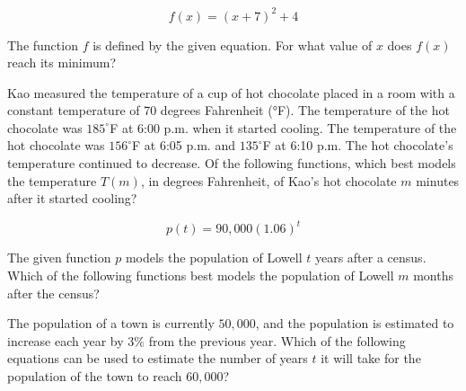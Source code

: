 \[f(x) = (x + 7)^2 + 4\]


The function $f$ is defined by the given equation.  
For what value of $x$ does $f(x)$ reach its minimum?

\vspace{2em}
\noindent\markforreview
\vspace{1em}

Kao measured the temperature of a cup of hot chocolate placed in a room with a constant temperature of 70 degrees Fahrenheit (°F).  
The temperature of the hot chocolate was $185^\circ$F at 6:00 p.m. when it started cooling.  
The temperature of the hot chocolate was $156^\circ$F at 6:05 p.m. and $135^\circ$F at 6:10 p.m.  
The hot chocolate’s temperature continued to decrease.  
Of the following functions, which best models the temperature $T(m)$, in degrees Fahrenheit, of Kao’s hot chocolate $m$ minutes after it started cooling?

\vspace{0.75em}




\newpage

\noindent\markforreview
\vspace{1em}


\[p(t) = 90,\!000(1.06)^t\]


The given function $p$ models the population of Lowell $t$ years after a census.  
Which of the following functions best models the population of Lowell $m$ months after the census?

\vspace{0.75em}


\vspace{2em}

\noindent\markforreview
\vspace{1em}

The population of a town is currently $50,\!000$, and the population is estimated to increase each year by $3\%$ from the previous year.  
Which of the following equations can be used to estimate the number of years $t$ it will take for the population of the town to reach $60,\!000$?

